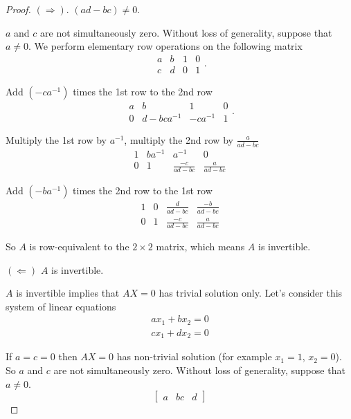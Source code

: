 \begin{proof}
    $(\Rightarrow)$. $(ad - bc)\ne 0$.

    $a$ and $c$ are not simultaneously zero. Without loss of generality, suppose that $a\ne 0$. We perform elementary row operations on the following matrix
    \[
        \begin{array}{cc|cc}
            a & b & 1 & 0 \\
            c & d & 0 & 1
        \end{array}.
    \]

    Add $(-ca^{-1})$ times the 1st row to the 2nd row
    \[
        \begin{array}{cc|cc}
            a & b            & 1        & 0 \\
            0 & d - bca^{-1} & -ca^{-1} & 1
        \end{array}.
    \]

    Multiply the 1st row by $a^{-1}$, multiply the 2nd row by $\frac{a}{ad-bc}$
    \[
        \begin{array}{cc|cc}
            1 & ba^{-1} & a^{-1}           & 0               \\
            0 & 1       & \frac{-c}{ad-bc} & \frac{a}{ad-bc}
        \end{array}
    \]

    Add $(-ba^{-1})$ times the 2nd row to the 1st row
    \[
        \begin{array}{cc|cc}
            1 & 0 & \frac{d}{ad-bc}  & \frac{-b}{ad-bc} \\
            0 & 1 & \frac{-c}{ad-bc} & \frac{a}{ad-bc}
        \end{array}
    \]

    So $A$ is row-equivalent to the $2\times 2$ matrix, which means $A$ is invertible.

    $(\Leftarrow)$ $A$ is invertible.

    $A$ is invertible implies that $AX = 0$ has trivial solution only. Let's consider this system of linear equations
    \[
        \begin{split}
            ax_{1} + bx_{2} = 0 \\
            cx_{1} + dx_{2} = 0
        \end{split}
    \]

    If $a = c = 0$ then $AX = 0$ has non-trivial solution (for example $x_{1} = 1$, $x_{2} = 0$). So $a$ and $c$ are not simultaneously zero. Without loss of generality, suppose that $a\ne 0$.
    \[
        \begin{bmatrix}
            a & b
            c & d
        \end{bmatrix}
    \]


\end{proof}

